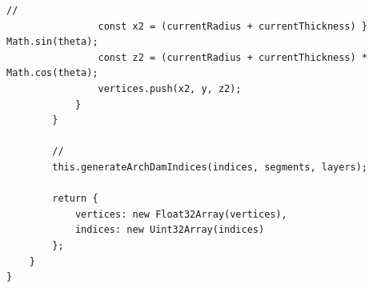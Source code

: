 \begin{lstlisting}[style=javascript]
                // 
                const x2 = (currentRadius + currentThickness) } Math.sin(theta);
                const z2 = (currentRadius + currentThickness) * Math.cos(theta);
                vertices.push(x2, y, z2);
            }
        }
        
        // 
        this.generateArchDamIndices(indices, segments, layers);
        
        return {
            vertices: new Float32Array(vertices),
            indices: new Uint32Array(indices)
        };
    }
}
\end{lstlisting}

\hypertarget{section-80}{%
\subsubsection{}\label{section-80}}

